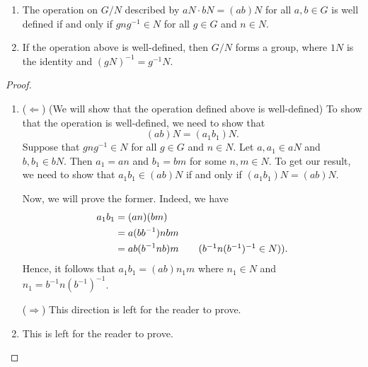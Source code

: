 \begin{prop}[5]
    \begin{enumerate}
        \item[(1)] The operation on \( G / N  \) described by \( aN \cdot bN = (ab) N  \) for all \( a,b \in G  \) is well defined if and only if \( g n g^{-1} \in N  \) for all \( g \in G  \) and \( n \in N  \). 
        \item[(2)] If the operation above is well-defined, then \( G / N  \) forms a group, where \( 1 N  \) is the identity and \( (gN)^{-1} = g^{-1}N \).
    \end{enumerate}
\end{prop}
\begin{proof}
    \begin{enumerate}
        \item[(1)] (\( \Longleftarrow \)) (We will show that the operation defined above is well-defined)  To show that the operation is well-defined, we need to show that 
    \[  (ab)N = ({a}_{1}{b}_{1})N. \]
    Suppose that \( g n g^{-1} \in N  \) for all \( g \in G  \) and \( n \in N  \). Let \( a, {a}_{1} \in aN  \) and \( b, {b}_{1} \in bN \). Then \( {a}_{1} = an   \) and \( {b}_{1} = b m \) for some \( n,m \in N \). To get our result, we need to show that \( {a}_{1} {b}_{1} \in (ab)N \) if and only if \( ({a}_{1}{b}_{1})N = (ab)N \). 

    Now, we will prove the former. Indeed, we have 
    \begin{align*}
        {a}_{1}{b}_{1} &= (an)(bm) \\
                       &= a(b b^{-1}) n b m \\
                       &= ab (b^{-1} n b) m \tag{\(b^{-1} n (b^{-1})^{-1} \in N)\)}.
    \end{align*}
    Hence, it follows that \( {a}_{1} {b}_{1} = (ab) {n}_{1} m \) where \( {n}_{1} \in N \) and \( {n}_{1} = b^{-1} n (b^{-1})^{-1} \).

    (\( \Longrightarrow \)) This direction is left for the reader to prove.
        \item[(2)] This is left for the reader to prove.
    \end{enumerate} 



\end{proof}
